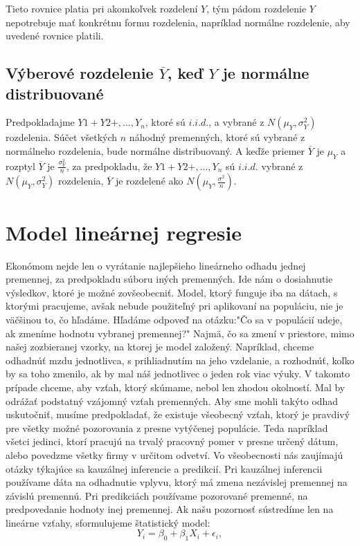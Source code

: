 \documentclass[]{tukediphc}
\begin{document}
Tieto rovnice platia pri akomkoľvek rozdelení $Y$, tým pádom rozdelenie $Y$ nepotrebuje mať konkrétnu formu rozdelenia, napríklad normálne rozdelenie, aby uvedené rovnice platili.  

\subsection{Výberové rozdelenie $\overline{Y}$, keď $Y$ je normálne distribuované}

Predpokladajme $Y1 + Y2 +, ..., Y_n$, ktoré sú $i.i.d.$, a vybrané z $N(\mu_{Y}, \sigma^2_{Y})$ rozdelenia. Súčet všetkých $n$ náhodný premenných, ktoré sú vybrané z normálneho rozdelenia, bude normálne distribuovaný. A keďže priemer $\overline{Y}$ je $\mu_{Y}$ a rozptyl $\overline{Y}$ je $\frac{\sigma^2_Y}{n}$, za predpokladu, že $Y1 + Y2 +, ..., Y_n$ sú $i.i.d.$ vybrané z $N(\mu_{Y}, \sigma^2_{Y})$ rozdelenia, $\overline{Y}$ je rozdelené ako $N(\mu_{Y}, \frac{\sigma^2}{n})$.  

\section{Model lineárnej regresie}

Ekonómom nejde len o vyrátanie najlepšieho lineárneho odhadu jednej premennej, za predpokladu súboru iných premenných. Ide nám o dosiahnutie výsledkov, ktoré je možné zovšeobecniť. Model, ktorý funguje iba na dátach, s ktorými pracujeme, avšak nebude použiteľný pri aplikovaní na populáciu, nie je väčšinou to, čo hľadáme. Hľadáme odpoveď na otázku:"Čo sa v populácií udeje, ak zmeníme hodnotu vybranej premennej?" Najmä, čo sa zmení v priestore, mimo našej zozbieranej vzorky, na ktorej je model založený. Napríklad, chceme odhadnúť mzdu jednotlivca, s prihliadnutím na jeho vzdelanie, a rozhodnúť, koľko by sa toho zmenilo, ak by mal náš jednotlivec o jeden rok viac výuky. V takomto prípade chceme, aby vzťah, ktorý skúmame, nebol len zhodou okolností. Mal by odrážať podstatný vzájomný vzťah premenných.  Aby sme mohli takýto odhad uskutočniť, musíme predpokladať, že existuje všeobecný vzťah, ktorý je pravdivý pre všetky možné pozorovania z presne vytýčenej populácie. Teda napríklad všetci jedinci, ktorí pracujú na trvalý pracovný pomer v presne určený dátum, alebo povedzme všetky firmy v určitom odvetví. Vo všeobecnosti nás zaujímajú otázky týkajúce sa kauzálnej inferencie a predikcií. Pri kauzálnej inferencii používame dáta na odhadnutie vplyvu, ktorý má zmena nezávislej premennej na závislú premennú. Pri predikciách používame pozorované premenné, na predpovedanie hodnoty inej premennej. Ak našu pozornosť sústredíme len na lineárne vzťahy, sformulujeme štatistický model: 
\begin{equation}
    Y_i = \beta_0 + \beta_{1} X_{i} + \epsilon_i,
\end{equation}
\end{document}
